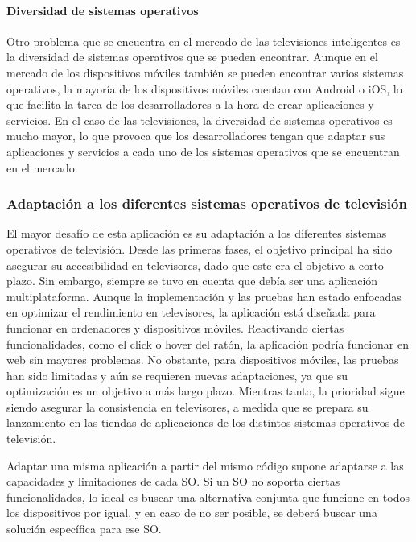 \paragraph{Diversidad de sistemas operativos}
Otro problema que se encuentra en el mercado de las televisiones inteligentes es la diversidad de sistemas operativos
que se pueden encontrar. Aunque en el mercado de los dispositivos móviles también se pueden encontrar varios sistemas
operativos, la mayoría de los dispositivos móviles cuentan con Android o iOS, lo que facilita la tarea de los
desarrolladores a la hora de crear aplicaciones y servicios. En el caso de las televisiones, la diversidad de sistemas
operativos es mucho mayor, lo que provoca que los desarrolladores tengan que adaptar sus aplicaciones y servicios a
cada uno de los sistemas operativos que se encuentran en el mercado.

\subsubsection{Adaptación a los diferentes sistemas operativos de televisión}
\label{sec:adaptacion}

El mayor desafío de esta aplicación es su adaptación a los diferentes sistemas operativos de televisión. Desde las 
primeras fases, el objetivo principal ha sido asegurar su accesibilidad en televisores, dado que este era el 
objetivo a corto plazo. Sin embargo, siempre se tuvo en cuenta que debía ser una aplicación multiplataforma. 
Aunque la implementación y las pruebas han estado enfocadas en optimizar el rendimiento en televisores, la 
aplicación está diseñada para funcionar en ordenadores y dispositivos móviles. Reactivando ciertas funcionalidades, 
como el click o hover del ratón, la aplicación podría funcionar en web sin mayores problemas. No obstante, para 
dispositivos móviles, las pruebas han sido limitadas y aún se requieren nuevas adaptaciones, ya que su optimización 
es un objetivo a más largo plazo. Mientras tanto, la prioridad sigue siendo asegurar la consistencia en televisores, 
a medida que se prepara su lanzamiento en las tiendas de aplicaciones de los distintos sistemas operativos de televisión.

Adaptar una misma aplicación a partir del mismo código supone adaptarse a las capacidades y limitaciones de cada
SO. Si un SO no soporta ciertas funcionalidades, lo ideal es buscar una alternativa conjunta que funcione en todos
los dispositivos por igual, y en caso de no ser posible, se deberá buscar una solución específica para ese SO.

